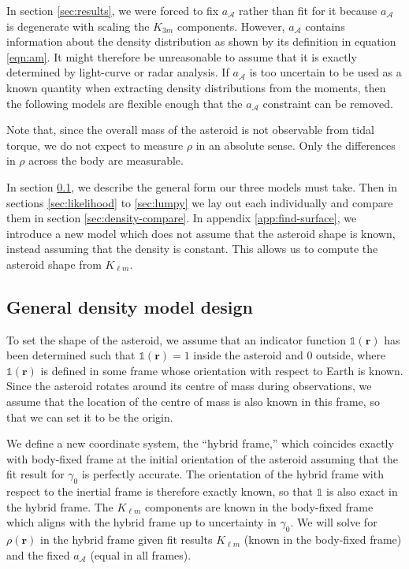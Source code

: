 \documentclass[fleqn,usenatbib]{mnras}
\begin{document}
In section \ref{sec:results}, we were forced to fix $a_\mathcal{A}$ rather than fit for it because $a_\mathcal{A}$ is degenerate with scaling the $K_{3m}$ components. However, $a_\mathcal{A}$ contains information about the density distribution as shown by its definition in equation \ref{eqn:am}. It might therefore be unreasonable to assume that it is exactly determined by light-curve or radar analysis. If $a_\mathcal{A}$ is too uncertain to be used as a known quantity when extracting density distributions from the moments, then the following models are flexible enough that the $a_\mathcal{A}$ constraint can be removed.

Note that, since the overall mass of the asteroid is not observable from tidal torque, we do not expect to measure $\rho$ in an absolute sense. Only the differences in $\rho$ across the body are measurable.

In section \ref{sec:general-density}, we describe the general form our three models must take. Then in sections \ref{sec:likelihood} to \ref{sec:lumpy} we lay out each individually and compare them in section \ref{sec:density-compare}. In appendix \ref{app:find-surface}, we introduce a new model which does not assume that the asteroid shape is known, instead assuming that the density is constant. This allows us to compute the asteroid shape from $K_{\ell m}$.


\subsection{General density model design}
\label{sec:general-density}

To set the shape of the asteroid, we assume that an indicator function $\mathds{1}(\bm r)$ has been determined such that $\mathds{1}(\bm r) = 1$ inside the asteroid and 0 outside, where $\mathds{1}(\bm r)$ is defined in some frame whose orientation with respect to Earth is known. Since the asteroid rotates around its centre of mass during observations, we assume that the location of the centre of mass is also known in this frame, so that we can set it to be the origin.

We define a new coordinate system, the ``hybrid frame,'' which coincides exactly with body-fixed frame at the initial orientation of the asteroid assuming that the fit result for $\gamma_0$ is perfectly accurate. The orientation of the hybrid frame with respect to the inertial frame is therefore exactly known, so that $\mathds{1}$ is also exact in the hybrid frame. The $K_{\ell m}$ components are known in the body-fixed frame which aligns with the hybrid frame up to uncertainty in $\gamma_0$. We will solve for $\rho(\bm r)$ in the hybrid frame given fit results $K_{\ell m}$ (known in the body-fixed frame) and the fixed $a_\mathcal{A}$ (equal in all frames).
\end{document}
